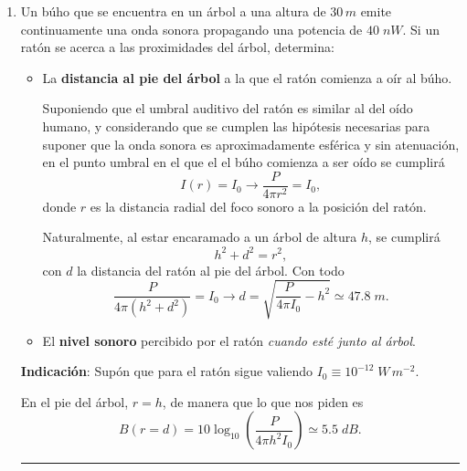 \documentclass[a4paper,12pt]{exam}
\newcommand{\halmos}{\vspace*{-7mm}
	
					\begin{flushright}
						\rule{1mm}{2.5mm} 
					\end{flushright}\vspace*{-6mm}
						
					  }
\renewcommand{\qed}{\halmos}
\begin{document}
\begin{enumerate}
\newpage
	\item 	Un búho que se encuentra en un árbol a una altura de $30\,m$ emite continuamente una onda sonora propagando una potencia  de $40\;nW$. Si un ratón se acerca a las proximidades del árbol, determina:
			\begin{itemize}
				\item[a)] La \textbf{distancia al pie del árbol} a la que el ratón comienza a oír al búho.
           	\begin{mdframed}[backgroundcolor=yellow!20] 
            	Suponiendo que el umbral auditivo del ratón es similar al del oído humano, y considerando que se cumplen las hipótesis necesarias para suponer que la onda sonora es aproximadamente esférica y sin atenuación, en el punto umbral en el que el el búho comienza a ser oído se cumplirá
            	$$I(r)=I_0\longrightarrow \frac{P}{4\pi r^2}=I_0,$$
            	donde $r$ es la distancia radial del foco sonoro a la posición del ratón. 
            	
            	Naturalmente, al estar encaramado a un árbol de altura $h$, se cumplirá
            	$$h^2+d^2=r^2,$$
            	con $d$ la distancia del ratón al pie del árbol. Con todo
            	$$\frac{P}{4\pi(h^2+d^2)}=I_0\longrightarrow d=\sqrt{\frac{P}{4\pi I_0}-h^2}\simeq 47.8\;m.$$
            	\end{mdframed}
				\item[b)] El \textbf{nivel sonoro} percibido por el ratón \textit{cuando esté junto al árbol}.
			\end{itemize}
			\vspace{0ex}
			
		 \begin{footnotesize} 
            	\textbf{Indicación}: Supón que para el ratón sigue valiendo $I_0\equiv 10^{-12}\;W\,m^{-2}$.			\end{footnotesize}
            	
            	\begin{mdframed}[backgroundcolor=yellow!20] 
            	En el pie del árbol, $r=h$, de manera que lo que nos piden es
            	$$B(r=d)=10\log_{10}\left(\frac{P}{4\pi h^2I_0}\right)\simeq 5.5\;dB.$$
            	\end{mdframed}
            	
            	
		\qed
	


\end{enumerate}
\end{document}
